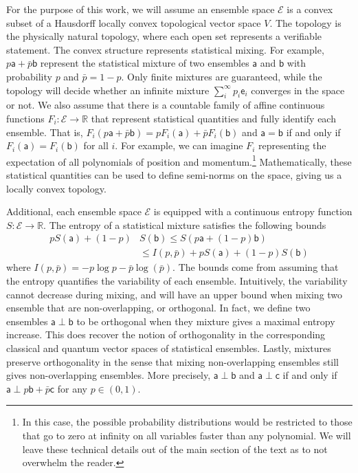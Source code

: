 \documentclass[10pt,twocolumn, nofootinbib]{revtex4-2}
\newcommand{\ens}[1][e] {\mathsf{#1}} %
\newcommand{\Ens}[1][E] {\mathcal{#1}} %
\def\ortho{\perp}
\begin{document}
For the purpose of this work, we will assume an ensemble space $\Ens$ is a convex subset of a Hausdorff locally convex topological vector space $V$. The topology is the physically natural topology, where each open set represents a verifiable statement. The convex structure represents statistical mixing. For example, $p \ens[a] + \bar{p} \ens[b]$ represent the statistical mixture of two ensembles $\ens[a]$ and $\ens[b]$ with probability $p$ and $\bar{p} = 1 - p$. Only finite mixtures are guaranteed, while the topology will decide whether an infinite mixture $\sum_{i}^{\infty} p_i \ens_i$ converges in the space or not. We also assume that there is a countable family of affine continuous functions $F_i : \Ens \to \mathbb{R}$ that represent statistical quantities and fully identify each ensemble. That is, $F_i(p \ens[a] + \bar{p} \ens[b]) = p F_i(\ens[a]) + \bar{p} F_i(\ens[b])$ and $\ens[a] = \ens[b]$ if and only if $F_i(\ens[a]) = F_i(\ens[b])$ for all $i$. For example, we can imagine $F_i$ representing the expectation of all polynomials of position and momentum.\footnote{In this case, the possible probability distributions would be restricted to those that go to zero at infinity on all variables faster than any polynomial. We will leave these technical details out of the main section of the text as to not overwhelm the reader.} Mathematically, these statistical quantities can be used to define semi-norms on the space, giving us a locally convex topology.

Additional, each ensemble space $\Ens$ is equipped with a continuous entropy function $S : \Ens \to \mathbb{R}$. The entropy of a statistical mixture satisfies the following bounds
\begin{equation}
	\begin{aligned}
		p S(\ens[a]) + (1-p) &S(\ens[b]) \leq S(p \ens[a] + (1-p) \ens[b]) \\
		&\leq I(p,\bar{p}) + p S(\ens[a]) + (1-p) S(\ens[b])
	\end{aligned}
\end{equation}
where $I(p,\bar{p}) = - p \log p - \bar{p} \log(\bar{p})$. The bounds come from assuming that the entropy quantifies the variability of each ensemble. Intuitively, the variability cannot decrease during mixing, and will have an upper bound when mixing two ensemble that are non-overlapping, or orthogonal. In fact, we define two ensembles $\ens[a] \ortho \ens[b]$ to be orthogonal when they mixture gives a maximal entropy increase. This does recover the notion of orthogonality in the corresponding classical and quantum vector spaces of statistical ensembles. Lastly, mixtures preserve orthogonality in the sense that mixing non-overlapping ensembles still gives non-overlapping ensembles. More precisely, $\ens[a] \ortho \ens[b]$ and $\ens[a] \ortho \ens[c]$ if and only if $\ens[a] \ortho p \ens[b] + \bar{p} \ens[c]$ for any $p \in (0,1)$.
\end{document}
